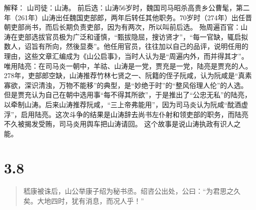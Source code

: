\documentclass[]{book}
\begin{document}
解释： 山司徒：山涛。
前后选：山涛56岁时，魏国司马昭杀高贵乡公曹髦，第二年（261年）山涛出任魏国吏部郎，两年后转任其他职务。70岁时（274年）出任晋朝吏部尚书，而后长期负责吏部，因为有两次，所以叫前后选。
殆周遍百官：山涛在吏部选拔官员极为广泛和谨慎，``甄拔隐屈，搜访贤才''，``每一官缺，辄启拟数人，诏旨有所向，然後显奏''。他任用官员，往往加以自己的品评，说明任用的理由，这些文章汇编成为《山公启事》，当时人认为是``周遍内外，而并得其才''。
唯用陆亮：在司马炎一朝中，羊祜、山涛是一党，贾充是一党，陆亮是贾充的人。278年，吏部郎空缺，山涛推荐竹林七贤之一、阮籍的侄子阮咸，认为阮咸是``真素寡欲，深识清浊，万物不能移''的典型，是``妙绝于时''的``整风俗理人伦''的人选。但是贾充认为自己在朝中选用事``每不得其所欲''，于是推出了``公忠无私''的陆亮，以牵制山涛。后来山涛推荐阮咸，``三上帝弗能用''，因为司马炎认为阮咸``酖酒虚浮''，启用陆亮。这次斗争的结果是山涛辞去尚书左仆射和领吏部的职务，而陆亮不久被揭发受贿，司马炎用舆车把山涛请回。
这个故事是说山涛执政有识人之能。

\section{3.8}\label{section-162}

\begin{quote}
嵇康被诛后，山公举康子绍为秘书丞。绍咨公出处，公曰：``为君思之久矣。大地四时，犹有消息，而况人乎！''
\end{quote}
\end{document}
